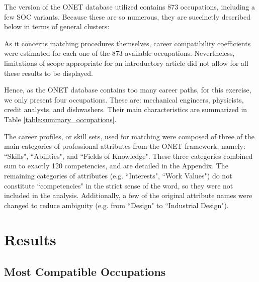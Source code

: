 \documentclass{article}
\begin{document}
The version of the ONET database utilized contains 873 occupations, including a few SOC variants. Because these are so numerous, they are succinctly described below in terms of general clusters:

\GeneralOccupationalStatistics

As it concerns matching procedures themselves, career compatibility coefficients were estimated for each one of the 873 available occupations. Nevertheless, limitations of scope appropriate for an introductory article did not allow for all these results to be displayed. 

Hence, as the ONET database contains too many career paths, for this exercise, we only present four occupations. These are: mechanical engineers, physicists, credit analysts, and dishwashers. Their main characteristics are summarized in Table \ref{table:summary_occupations}.

\SummaryOccupations

The career profiles, or skill sets, used for matching were composed of three of the main categories of professional attributes from the ONET framework, namely: ``Skills", ``Abilities", and ``Fields of Knowledge". These three categories combined sum to exactly 120 competencies, and are detailed in the Appendix. The remaining categories of attributes (e.g. ``Interests", ``Work Values") do not constitute ``competencies" in the strict sense of the word, so they were not included in the analysis. Additionally, a few of the original attribute names were changed to reduce ambiguity (e.g. from ``Design" to ``Industrial Design").


\section{Results}

\subsection{Most Compatible Occupations}

\MatchesEngineers

\MatchesPhysicists

\MatchesCreditAnalysts
\end{document}

